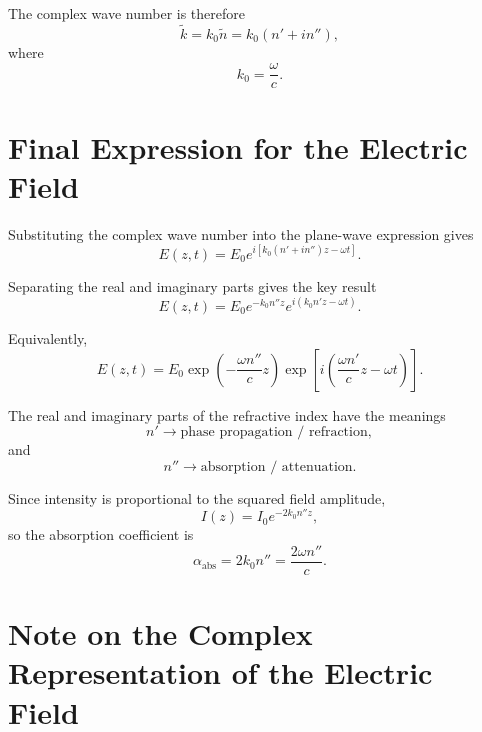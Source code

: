 \documentclass[11pt]{article}
\begin{document}
The complex wave number is therefore
\begin{equation}
\tilde{k}
=
k_0\tilde{n}
=
k_0(n'+in''),
\end{equation}
where
\begin{equation}
k_0=\frac{\omega}{c}.
\end{equation}

\section*{Final Expression for the Electric Field}

Substituting the complex wave number into the plane-wave expression gives
\begin{equation}
E(z,t)
=
E_0
e^{i[k_0(n'+in'')z-\omega t]}.
\end{equation}

Separating the real and imaginary parts gives the key result
\begin{equation}
\boxed{
E(z,t)
=
E_0
e^{-k_0n''z}
e^{i(k_0n'z-\omega t)}
}.
\end{equation}

Equivalently,
\begin{equation}
E(z,t)
=
E_0
\exp\!\left(-\frac{\omega n''}{c}z\right)
\exp\!\left[
i\left(
\frac{\omega n'}{c}z-\omega t
\right)
\right].
\end{equation}

The real and imaginary parts of the refractive index have the meanings
\begin{equation}
n' \rightarrow \text{phase propagation / refraction},
\end{equation}
and
\begin{equation}
n'' \rightarrow \text{absorption / attenuation}.
\end{equation}

Since intensity is proportional to the squared field amplitude,
\begin{equation}
I(z)=I_0e^{-2k_0n''z},
\end{equation}
so the absorption coefficient is
\begin{equation}
\alpha_{\mathrm{abs}}
=
2k_0n''
=
\frac{2\omega n''}{c}.
\end{equation}


\section*{Note on the Complex Representation of the Electric Field}
\end{document}
